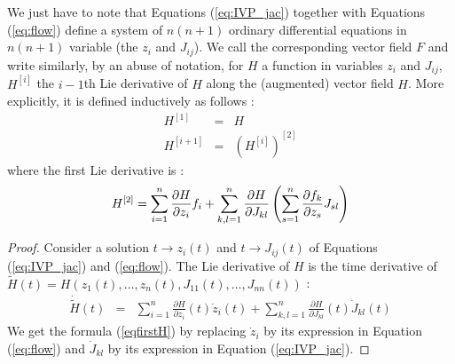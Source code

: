 \documentclass{sig-alternate-05-2015} %
\begin{document}
We just have to note that Equations (\ref{eq:IVP_jac}) together with Equations
(\ref{eq:flow}) define a system of $n(n+1)$ ordinary differential equations in $n(n+1)$
variable (the $z_i$ and $J_{ij}$). We call the corresponding vector field $F$ and
write similarly, by an abuse of notation, for $H$ a function in variables $z_i$ and $J_{ij}$,
$H^{[i]}$ the $i-1$th Lie derivative of $H$ along the (augmented) vector field $H$. More
explicitly, it is defined inductively as follows : 
\begin{eqnarray}
H^{[1]} & = & H \\ 
H^{[i+1]} & = & (H^{[i]})^{[2]}
\end{eqnarray}
\noindent where the first Lie derivative is :
\begin{equation}
H^{[2]} = 
\sum\limits_{i=1}^n \frac{\partial H}{\partial z_i} f_i \\
+\sum\limits_{k,l=1}^n \frac{\partial H}{\partial J_{kl}} \left(
\sum\limits_{s=1}^n \frac{\partial f_k}{\partial z_s} J_{sl}\right)
\label{eqfirstH}
\end{equation}

\begin{proof}
Consider a solution $t \rightarrow z_i(t)$ and $t \rightarrow J_{ij}(t)$ of
Equations (\ref{eq:IVP_jac}) and (\ref{eq:flow}). The Lie derivative of $H$
is
the time derivative of $\tilde{H}(t)=H(z_1(t),\ldots,z_n(t),J_{11}(t),\ldots,J_{nn}(t))$ : 
$$\begin{array}{rcl}
\dot{\tilde{H}}(t) & = & \sum\limits_{i=1}^{n} \frac{\partial H}{\partial z_i}(t)
\dot{z}_i(t)+\sum\limits_{k,l=1}^n \frac{\partial H}{\partial J_{kl}}(t) \dot{J}_{kl}(t)
\end{array}$$
We get the formula (\ref{eqfirstH}) by 
replacing $\dot{z}_i$ by its expression in Equation (\ref{eq:flow}) and
$\dot{J}_{kl}$ by its expression in Equation (\ref{eq:IVP_jac}). 
\end{proof}
\end{document}
